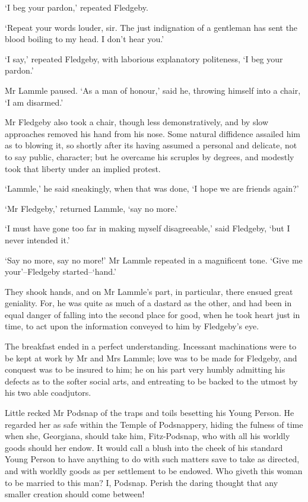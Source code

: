 ‘I beg your pardon,’ repeated Fledgeby.

‘Repeat your words louder, sir. The just indignation of a gentleman has
sent the blood boiling to my head. I don’t hear you.’

‘I say,’ repeated Fledgeby, with laborious explanatory politeness, ‘I
beg your pardon.’

Mr Lammle paused. ‘As a man of honour,’ said he, throwing himself into a
chair, ‘I am disarmed.’

Mr Fledgeby also took a chair, though less demonstratively, and by
slow approaches removed his hand from his nose. Some natural diffidence
assailed him as to blowing it, so shortly after its having assumed a
personal and delicate, not to say public, character; but he overcame
his scruples by degrees, and modestly took that liberty under an implied
protest.

‘Lammle,’ he said sneakingly, when that was done, ‘I hope we are friends
again?’

‘Mr Fledgeby,’ returned Lammle, ‘say no more.’

‘I must have gone too far in making myself disagreeable,’ said Fledgeby,
‘but I never intended it.’

‘Say no more, say no more!’ Mr Lammle repeated in a magnificent tone.
‘Give me your’--Fledgeby started--‘hand.’

They shook hands, and on Mr Lammle’s part, in particular, there ensued
great geniality. For, he was quite as much of a dastard as the other,
and had been in equal danger of falling into the second place for good,
when he took heart just in time, to act upon the information conveyed to
him by Fledgeby’s eye.

The breakfast ended in a perfect understanding. Incessant machinations
were to be kept at work by Mr and Mrs Lammle; love was to be made for
Fledgeby, and conquest was to be insured to him; he on his part
very humbly admitting his defects as to the softer social arts, and
entreating to be backed to the utmost by his two able coadjutors.

Little recked Mr Podsnap of the traps and toils besetting his Young
Person. He regarded her as safe within the Temple of Podsnappery, hiding
the fulness of time when she, Georgiana, should take him, Fitz-Podsnap,
who with all his worldly goods should her endow. It would call a blush
into the cheek of his standard Young Person to have anything to do with
such matters save to take as directed, and with worldly goods as per
settlement to be endowed. Who giveth this woman to be married to this
man? I, Podsnap. Perish the daring thought that any smaller creation
should come between!

